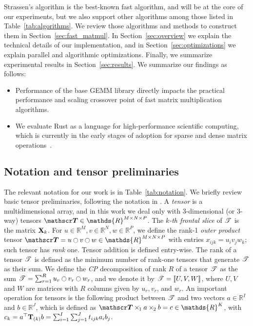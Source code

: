 \documentclass[a4paper, leqno, 11pt]{article}
\renewcommand{\mathbb}[1]{\mathds{#1}}
\newcommand{\R}{\mathbb{R}}
\theoremstyle{definition}
\theoremstyle{remark}
\theoremstyle{experimental}
\begin{document}
Strassen's algorithm is the best-known fast algorithm, and will be at the core of our
experiments, but we also support other algorithms among those
listed in Table~\ref{tab:algorithms}. We review those algorithms and methods to construct them in
Section~\ref{sec:fast_matmul}. In Section~\ref{sec:overview} we explain the technical details of our
implementation, and in Section~\ref{sec:optimizations} we explain parallel and algorithmic
optimizations. Finally, we summarize experimental results in Section~\ref{sec:results}.
We summarize our findings as follows:
\begin{itemize}
  \item Performance of the base GEMM library directly impacts the practical performance and scaling crossover point of fast matrix multiplication algorithms.
  \item We evaluate Rust as a language for high-performance scientific computing, which is currently in the early stages of adoption for sparse and dense matrix operations~\cite{lombardo2026evaluatingrustsparsematrix}.
\end{itemize}


\subsection{Notation and tensor preliminaries}
\label{sec:not_prel}

The relevant notation for our work is in Table~\ref{tab:notation}. We briefly review basic tensor preliminaries,
following the notation in \cite{BK25}.
A \emph{tensor} is a multidimensional array, and in this work we deal only with 3-dimensional (or 3-way)
tensors $ \Tn{T} \in \R^{M\times N\times P}$. The \emph{$ k $-th frontal slice} of $ \Tn{T} $ is the matrix
$ \Mx{X}_k $. For $ u \in \R^M, v \in \R^N, w \in \R^P $, we define the rank-1 \emph{outer
product} tensor $\Tn{T} = u \topp v \topp w \in \R^{M \times N \times P}$ with entries
$ x_{ijk} = u_iv_jw_k $; such tensor has \emph{rank} one. Tensor addition is defined entry-wise. The rank of a tensor $ \Tn{T} $
is defined as the minimum number of rank-one tensors that generate $ \Tn{T} $ as their sum.
We define the \emph{CP} decomposition of rank $ R $ of a tensor $\Tn{T}$ as the sum $ \Tn{T} =
\sum_{r=1}^R u_r \topp v_r \topp w_r $, and we denote it by $ \Tn{T} = \dsqr{U,V,W} $, where $ U,V $
and $ W $ are matrices with $ R $ columns given by $ u_r,v_r $, and $ w_r $. An important operation
for tensors is the following product between $ \Tn{t} $ and two vectors $ a \in \R^I $ and $ b \in
\R^J $, which is defined as $ \Tn{t} \ttm[1] a \ttm[2] b = c \in \R^K $, with $ c_k =
a^{\top}\Tm{t}{k}b = \sum_{i=1}^I\sum_{j=1}^J t_{ijk} a_i b_j $.
\end{document}

